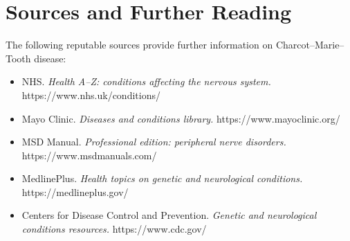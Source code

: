 \section*{Sources and Further Reading}
The following reputable sources provide further information on Charcot--Marie--Tooth disease:
\begin{itemize}
    \item NHS. \textit{Health A--Z: conditions affecting the nervous system.} https://www.nhs.uk/conditions/
    \item Mayo Clinic. \textit{Diseases and conditions library.} https://www.mayoclinic.org/
    \item MSD Manual. \textit{Professional edition: peripheral nerve disorders.} https://www.msdmanuals.com/
    \item MedlinePlus. \textit{Health topics on genetic and neurological conditions.} https://medlineplus.gov/
    \item Centers for Disease Control and Prevention. \textit{Genetic and neurological conditions resources.} https://www.cdc.gov/
\end{itemize}
